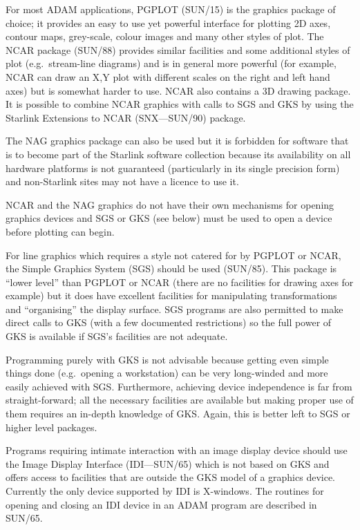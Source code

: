 \documentclass[twoside,11pt]{article}
\newcommand{\xref}[3]{#1}
\renewcommand{\_}{\texttt{\symbol{95}}}
\begin{document}
For most ADAM applications,
\xref{PGPLOT}{sun15}{} (SUN/15) is the graphics package of choice;
it provides an easy to use yet powerful interface for plotting 2D axes, contour
maps, grey-scale, colour images and many other styles of plot. The
\xref{NCAR package}{sun88}{}
(SUN/88) provides similar facilities and some additional styles of plot
(e.g.\ stream-line diagrams) and is in general more powerful (for example, NCAR
can draw an X,Y plot with different scales on the right and left hand axes) but
is somewhat harder to use. NCAR also contains a 3D drawing package. It
is possible to combine NCAR graphics with calls to SGS and GKS by using
the \xref{Starlink Extensions to NCAR}{sun90}{} (SNX---SUN/90) package.

The NAG graphics package can also be used but it is forbidden for
software that is to become part of the Starlink software collection because
its availability on all hardware platforms is not guaranteed
(particularly in its single precision form) and non-Starlink sites may
not have a licence to use it.

NCAR and the NAG graphics do not have their own mechanisms for opening graphics
devices and SGS or GKS (see below) must be used to open a device before
plotting can begin.

For line graphics which requires a style not catered for by PGPLOT or NCAR, the
\xref{Simple Graphics System}{sun85}{}
(SGS) should be used (SUN/85). This package is ``lower
level'' than PGPLOT or NCAR (there are no facilities for drawing axes for
example) but it does have excellent facilities for manipulating transformations
and ``organising'' the display surface. SGS programs are also permitted to make
direct calls to GKS (with a few documented restrictions) so the full power of
GKS is available if SGS's facilities are not adequate.

Programming purely with GKS is not advisable because getting even simple things
done (e.g.\ opening a workstation) can be very long-winded and more easily
achieved with SGS. Furthermore, achieving device independence is far from
straight-forward; all the necessary facilities are available but making proper
use of them requires an in-depth knowledge of GKS. Again, this is better left
to SGS or higher level packages.

Programs requiring intimate interaction with an image display device should use
the \xref{Image Display Interface}{sun65}{}
(IDI---SUN/65) which is not based on GKS and offers
access to facilities that are outside the GKS model of a graphics device.
Currently the only device supported by IDI is
X-windows. The routines for opening and closing an IDI device in an
ADAM program are described in SUN/65.
\end{document}
